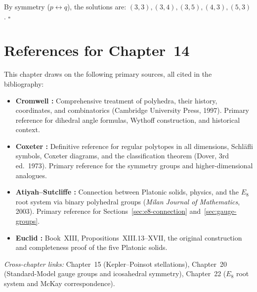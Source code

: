 By symmetry ($p \leftrightarrow q$), the solutions are:
$(3,3), (3,4), (3,5), (4,3), (5,3)$. \hfill $\square$


\section*{References for Chapter~14}
\label{sec:platonic-references}

This chapter draws on the following primary sources, all cited in the
bibliography:

\begin{itemize}
  \item \textbf{Cromwell \cite{cromwell_polyhedra}:} Comprehensive treatment of polyhedra,
        their history, coordinates, and combinatorics (Cambridge University Press, 1997).
        Primary reference for dihedral angle formulas, Wythoff construction,
        and historical context.
  \item \textbf{Coxeter \cite{coxeter_regular_polytopes}:} Definitive reference for regular
        polytopes in all dimensions, Schläfli symbols, Coxeter diagrams, and
        the classification theorem (Dover, 3rd ed.\ 1973).
        Primary reference for the symmetry groups and higher-dimensional analogues.
  \item \textbf{Atiyah–Sutcliffe \cite{atiyah_sutcliffe_polyhedra}:} Connection between
        Platonic solids, physics, and the $E_8$ root system via binary
        polyhedral groups (\emph{Milan Journal of Mathematics}, 2003).
        Primary reference for Sections~\ref{sec:e8-connection}
        and~\ref{sec:gauge-groups}.
  \item \textbf{Euclid \cite{euclid_elements}:} Book~XIII, Propositions~XIII.13–XVII,
        the original construction and completeness proof of the five Platonic solids.
\end{itemize}

\noindent\emph{Cross-chapter links:}
Chapter~15 (Kepler–Poinsot stellations),
Chapter~20 (Standard-Model gauge groups and icosahedral symmetry),
Chapter~22 ($E_8$ root system and McKay correspondence).
